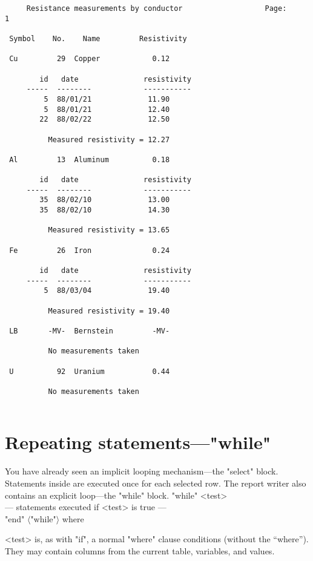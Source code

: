 \documentclass[11pt,a4paper]{report}
\def\opt#1{$\langle \mbox{#1} \rangle$}
\def\I{\index}
\begin{document}
\begin{verbatim}
     Resistance measurements by conductor                   Page:     1
 
 Symbol    No.    Name         Resistivity
 
 Cu         29  Copper            0.12
 
        id   date               resistivity
     -----  --------            -----------
         5  88/01/21             11.90
         5  88/01/21             12.40
        22  88/02/22             12.50
 
          Measured resistivity = 12.27
 
 Al         13  Aluminum          0.18
 
        id   date               resistivity
     -----  --------            -----------
        35  88/02/10             13.00
        35  88/02/10             14.30
 
          Measured resistivity = 13.65
 
 Fe         26  Iron              0.24
 
        id   date               resistivity
     -----  --------            -----------
         5  88/03/04             19.40
 
          Measured resistivity = 19.40
 
 LB       -MV-  Bernstein         -MV-
 
          No measurements taken
 
 U          92  Uranium           0.44
 
          No measurements taken
 
\end{verbatim}
 
\section{Repeating statements---"while"}
%
\I{while statement}
\I{looping}
You have already seen an implicit looping mechanism---the "select"
block.  Statements inside are executed once for each selected row.
The report writer also contains an explicit loop---the "while" block.
"while" <test>\\
  --- statements executed if <test> is true ---\\
  "end" \opt{"while"}
where
\begin{List}
\item[<test>] is, as with "if", a normal
"where" clause conditions (without the
``where'').  They may contain columns from the current table,
variables, and values.
\end{List}
 
\end{document}
